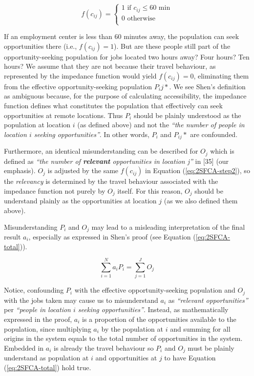 \documentclass[10pt,letterpaper]{article}
\begin{document}
\begin{equation}
\label{eq:binary-impedance}
f(c_{ij}) =
\begin{cases}
1\text{ if }c_{ij}\leq60\text{ min}\\
0\text{ otherwise}\\
\end{cases}
\end{equation}

If an employment center is less than 60 minutes away, the population can
seek opportunities there (i.e., \(f(c_{ij})=1\)). But are these people
still part of the opportunity-seeking population for jobs located two
hours away? Four hours? Ten hours? We assume that they are not because
their travel behaviour, as represented by the impedance function would
yield \(f(c_{ij})=0\), eliminating them from the effective
opportunity-seeking population \(P_ij*\). We see Shen's definition as
ambiguous because, for the purpose of calculating accessibility, the
impedance function defines what constitutes the population that
effectively can seek opportunities at remote locations. Thus \(P_i\)
should be plainly understood as the population at location \(i\) (as
defined above) and not the \emph{``the number of people in location
\(i\) seeking opportunities''}. In other words, \(P_i\) and \(P_{ij}*\)
are confounded.

Furthermore, an identical misunderstanding can be described for \(O_j\)
which is defined as \emph{``the number of \textbf{relevant}
opportunities in location j''} in {[}35{]} (our emphasis). \(O_j\) is
adjusted by the same \(f(c_{ij})\) in Equation (\ref{eq:2SFCA-step2}),
so the \emph{relevancy} is determined by the travel behaviour associated
with the impedance function not purely by \(O_j\) itself. For this
reason, \(O_j\) should be understand plainly as the opportunities at
location \(j\) (as we also defined them above).

Misunderstanding \(P_i\) and \(O_j\) may lead to a misleading
interpretation of the final result \(a_i\), especially as expressed in
Shen's proof (see Equation (\ref{eq:2SFCA-total})).

\begin{equation}
\label{eq:2SFCA-total}
\sum_{i=1}^N a_{i} P_i= \sum_{j=1}^JO_j
\end{equation}

Notice, confounding \(P_i\) with the effective opportunity-seeking
population and \(O_j\) with the jobs taken may cause us to misunderstand
\(a_{i}\) as \emph{``relevant opportunities''} per \emph{``people in
location \(i\) seeking opportunities''}. Instead, as mathematically
expressed in the proof, \(a_{i}\) is a proportion of the opportunities
available to the population, since multiplying \(a_i\) by the population
at \(i\) and summing for all origins in the system equals to the total
number of opportunities in the system. Embedded in \(a_i\) is already
the travel behaviour so \(P_i\) and \(O_j\) must be plainly understand
as population at \(i\) and opportunities at \(j\) to have Equation
(\ref{eq:2SFCA-total}) hold true.
\end{document}
